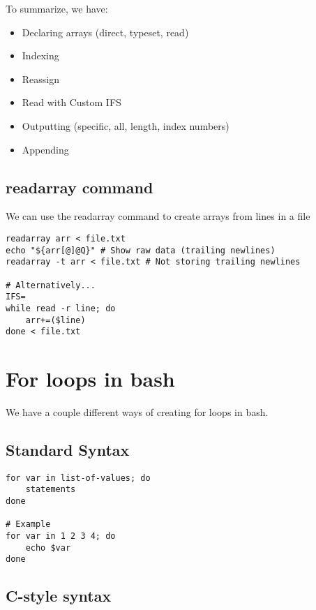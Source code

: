 \documentclass{report}
\begin{document}
    \bigbreak \noindent 
    To summarize, we have:
    \begin{itemize}
        \item Declaring arrays (direct, typeset, read)
        \item Indexing
        \item Reassign
        \item  Read with Custom IFS
        \item Outputting (specific, all, length, index numbers)
        \item Appending
    \end{itemize}

    \pagebreak \bigbreak \noindent 
    \subsection{readarray command}
    \bigbreak \noindent 
    We can use the readarray command to create arrays from lines in a file
    
    \begin{verbatim}
readarray arr < file.txt
echo "${arr[@]@Q}" # Show raw data (trailing newlines)
readarray -t arr < file.txt # Not storing trailing newlines

# Alternatively...
IFS=
while read -r line; do
    arr+=($line)
done < file.txt
    \end{verbatim}
    \bigbreak \noindent
    
    
    \pagebreak \bigbreak \noindent 
    \section{\LARGE For loops in bash}
    \bigbreak \noindent 
    We have a couple different ways of creating for loops in bash.
    \bigbreak \noindent 
    \subsection{Standard Syntax}
    \smallbreak \noindent
    
    \begin{verbatim}
for var in list-of-values; do
    statements
done

# Example
for var in 1 2 3 4; do
    echo $var
done
    \end{verbatim}
    \bigbreak \noindent
    

    \bigbreak \noindent 
    \subsection{C-style syntax}
    \smallbreak \noindent
    
\end{document}
